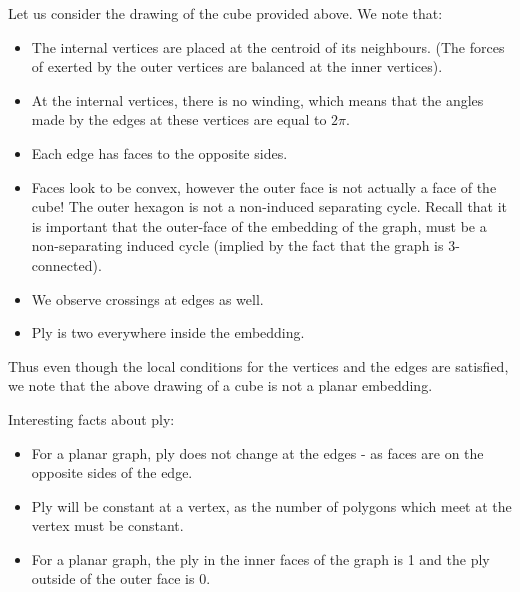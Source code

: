 \documentclass{article}
\begin{document}
    \medskip \noindent Let us consider the drawing of the cube provided above. We note that:
    \begin{itemize}
        \item The internal vertices are placed at the centroid of its neighbours. (The forces of exerted by the outer vertices are balanced at the inner vertices). 
        \item At the internal vertices, there is no winding, which means that the angles made by the edges at these vertices are equal to $2 \pi$.
        \item Each edge has faces to the opposite sides. 
        \item Faces look to be convex, however the outer face is not actually a face of the cube! The outer hexagon is not a non-induced separating cycle. Recall that it is important that the outer-face of the embedding of the graph, must be a non-separating induced cycle (implied by the fact that the graph is 3-connected). 
        \item We observe crossings at edges as well. 
        \item Ply is two everywhere inside the embedding. 
    \end{itemize}
    Thus even though the local conditions for the vertices and the edges are satisfied, we note that the above drawing of a cube is not a planar embedding.
  
     
    \medskip \noindent Interesting facts about ply:
    \begin{itemize}
        \item For a planar graph, ply does not change at the edges - as faces are on the opposite sides of the edge.
        \item Ply will be constant at a vertex, as the number of polygons which meet at the vertex must be constant.
        \item For a planar graph, the ply in the inner faces of the graph is 1 and the ply outside of the outer face is 0.
    \end{itemize}
    
\end{document}
